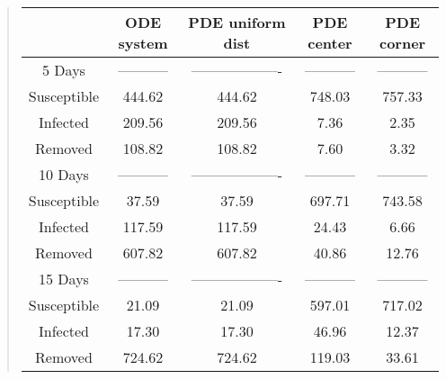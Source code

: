 \documentclass[%
twoside,                 %
final,                   %
chapterprefix=true,      %
open=right               %
10pt]{book}
\begin{document}
\begin{quote}
\begin{tabular}{ccccc}
\hline
\multicolumn{1}{c}{  } & \multicolumn{1}{c}{ ODE system } & \multicolumn{1}{c}{ PDE uniform dist } & \multicolumn{1}{c}{ PDE center } & \multicolumn{1}{c}{ PDE corner } \\
\hline
5 Days      & ----------- & ------------------- & ----------- & ----------- \\
\hline
Susceptible & 444.62      & 444.62              & 748.03      & 757.33      \\
Infected    & 209.56      & 209.56              & 7.36        & 2.35        \\
Removed     & 108.82      & 108.82              & 7.60        & 3.32        \\
\hline
10 Days     & ----------- & ------------------- & ----------- & ----------- \\
\hline
Susceptible & 37.59       & 37.59               & 697.71      & 743.58      \\
Infected    & 117.59      & 117.59              & 24.43       & 6.66        \\
Removed     & 607.82      & 607.82              & 40.86       & 12.76       \\
\hline
15 Days     & ----------- & ------------------- & ----------- & ----------- \\
\hline
Susceptible & 21.09       & 21.09               & 597.01      & 717.02      \\
Infected    & 17.30       & 17.30               & 46.96       & 12.37       \\
Removed     & 724.62      & 724.62              & 119.03      & 33.61       \\
\hline
\end{tabular}
\end{quote}

\noindent
\end{document}

